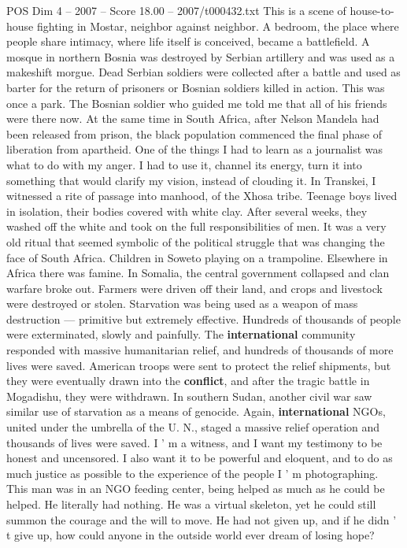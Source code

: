 \begin{textsample}{POS Dim 4 – 2007 – Score 18.00 – 2007/t000432.txt}
This is a scene of house-to-house fighting in Mostar, neighbor against neighbor.
A bedroom, the place where people share intimacy, where life itself is conceived, became a battlefield.
A mosque in northern Bosnia was destroyed by Serbian artillery and was used as a makeshift morgue.
Dead Serbian soldiers were collected after a battle and used as barter for the return of prisoners or Bosnian soldiers killed in action.
This was once a park.
The Bosnian soldier who guided me told me that all of his friends were there now.
At the same time in South Africa, after Nelson Mandela had been released from prison, the black population commenced the final phase of liberation from apartheid.
One of the things I had to learn as a journalist was what to do with my anger.
I had to use it, channel its energy, turn it into something that would clarify my vision, instead of clouding it.
In Transkei, I witnessed a rite of passage into manhood, of the Xhosa tribe.
Teenage boys lived in isolation, their bodies covered with white clay.
After several weeks, they washed off the white and took on the full responsibilities of men.
It was a very old ritual that seemed symbolic of the political struggle that was changing the face of South Africa.
Children in Soweto playing on a trampoline.
Elsewhere in Africa there was famine.
In Somalia, the central government collapsed and clan warfare broke out.
Farmers were driven off their land, and crops and livestock were destroyed or stolen.
Starvation was being used as a weapon of mass destruction — primitive but extremely effective.
Hundreds of thousands of people were exterminated, slowly and painfully.
The \textbf{international} community responded with massive humanitarian relief, and hundreds of thousands of more lives were saved.
American troops were sent to protect the relief shipments, but they were eventually drawn into the \textbf{conflict}, and after the tragic battle in Mogadishu, they were withdrawn.
In southern Sudan, another civil war saw similar use of starvation as a means of genocide.
Again, \textbf{international} NGOs, united under the umbrella of the U.
N., staged a massive relief operation and thousands of lives were saved.
I ' m a witness, and I want my testimony to be honest and uncensored.
I also want it to be powerful and eloquent, and to do as much justice as possible to the experience of the people I ' m photographing.
This man was in an NGO feeding center, being helped as much as he could be helped.
He literally had nothing.
He was a virtual skeleton, yet he could still summon the courage and the will to move.
He had not given up, and if he didn ' t give up, how could anyone in the outside world ever dream of losing hope?

\end{textsample}

